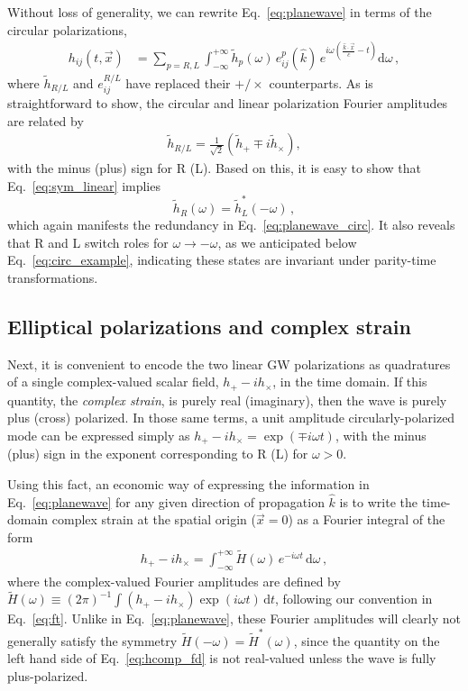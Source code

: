 \documentclass[aps,prd,twocolumn,superscriptaddress,preprintnumbers,floatfix,nofootinbib]{revtex4-2}
\newcommand{\beq}{\begin{equation}}
\newcommand{\eeq}{\end{equation}}
\newcommand{\infd}{\mathrm{d}}
\begin{document}
Without loss of generality, we can rewrite Eq.~\eqref{eq:planewave} in terms of the circular polarizations,
\begin{align} \label{eq:planewave_circ}
h_{ij}(t,\vec{x}) 
&= \sum_{p=R,L} \int_{-\infty}^{+\infty} \tilde{h}_p(\omega)\, e^p_{ij}(\hat{k})\, e^{i\omega \left(\frac{\hat{k}\cdot\vec{x}}{c}-t\right)} \infd \omega \, ,
\end{align}
where $\tilde{h}_{R/L}$ and $e^{R/L}_{ij}$ have replaced their $+/\times$ counterparts.
As is straightforward to show, the circular and linear polarization Fourier amplitudes are related by
\begin{align} \label{eq:circ_amps}
\tilde{h}_{R/L} = \frac{1}{\sqrt{2}} \left(\tilde{h}_+ \mp i\tilde{h}_\times \right) ,
\end{align}
with the minus (plus) sign for R (L).
Based on this, it is easy to show that Eq.~\eqref{eq:sym_linear} implies
\beq \label{eq:sym_circular}
\tilde{h}_R(\omega) = \tilde{h}_L^*(-\omega) \, ,
\eeq
which again manifests the redundancy in Eq.~\eqref{eq:planewave_circ}.
It also reveals that R and L switch roles for $\omega \to - \omega$, as we anticipated below Eq.~\eqref{eq:circ_example}, indicating these states are invariant under parity-time transformations.


\subsection{Elliptical polarizations and complex strain}
\label{sec:ellip}

Next, it is convenient to encode the two linear GW polarizations as quadratures of a single complex-valued scalar field, $h_+ - i h_\times$, in the time domain.
If this quantity, the \emph{complex strain}, is purely real (imaginary), then the wave is purely plus (cross) polarized.
In those same terms, a unit amplitude circularly-polarized mode can be expressed simply as $h_+ - i h_\times = \exp(\mp i \omega t)$, with the minus (plus) sign in the exponent corresponding to R (L) for $\omega > 0$.

Using this fact, an economic way of expressing the information in Eq.~\eqref{eq:planewave} for any given direction of propagation $\hat{k}$ is to write the time-domain complex strain at the spatial origin ($\vec{x}=0$) as a Fourier integral of the form
\begin{align} \label{eq:hcomp_fd}
h_+ - i h_\times = \int_{-\infty}^{+\infty} \tilde{H}(\omega)\, e^{-i \omega t} \,\infd \omega \, ,
\end{align}
where the complex-valued Fourier amplitudes are defined by $\tilde{H}(\omega) \equiv (2\pi)^{-1} \int (h_+ - i h_\times) \exp(i\omega t)\, \infd t$, following our convention in Eq.~\eqref{eq:ft}.
Unlike in Eq.~\eqref{eq:planewave}, these Fourier amplitudes will clearly not generally satisfy the symmetry $\tilde{H}(-\omega) = \tilde{H}^*(\omega)$, since the quantity on the left hand side of Eq.~\eqref{eq:hcomp_fd} is not real-valued unless the wave is fully plus-polarized.
\end{document}
